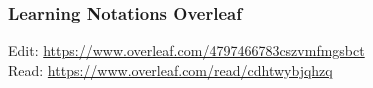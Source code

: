 \documentclass[aspectratio=169,xcolor=dvipsnames]{beamer}
\begin{document}
\begin{frame}
    
    \frametitle{Learning Notations Overleaf}
    
    Edit: \url{https://www.overleaf.com/4797466783cszvmfmgsbct}
    \\
    Read: \url{https://www.overleaf.com/read/cdhtwybjqhzq}

    
\end{frame}
\end{document}
